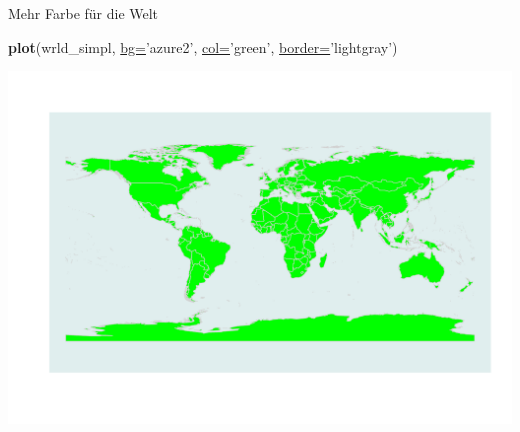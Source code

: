 \documentclass[ignorenonframetext,]{beamer}
\newenvironment{Shaded}{\begin{snugshade}}{\end{snugshade}}
\newcommand{\KeywordTok}[1]{\textcolor[rgb]{0.26,0.66,0.93}{\textbf{#1}}}
\newcommand{\DataTypeTok}[1]{\textcolor[rgb]{0.74,0.68,0.62}{\underline{#1}}}
\newcommand{\StringTok}[1]{\textcolor[rgb]{0.02,0.61,0.04}{#1}}
\newcommand{\NormalTok}[1]{\textcolor[rgb]{0.74,0.68,0.62}{#1}}
\begin{document}
\begin{frame}[fragile]{Mehr Farbe für die Welt}

\begin{Shaded}
\begin{Highlighting}[]
\KeywordTok{plot}\NormalTok{(wrld_simpl, }\DataTypeTok{bg=}\StringTok{'azure2'}\NormalTok{, }\DataTypeTok{col=}\StringTok{'green'}\NormalTok{,}
     \DataTypeTok{border=}\StringTok{'lightgray'}\NormalTok{)}
\end{Highlighting}
\end{Shaded}

\includegraphics{Geomedizin_files/figure-beamer/unnamed-chunk-59-1.pdf}

\end{frame}
\end{document}
